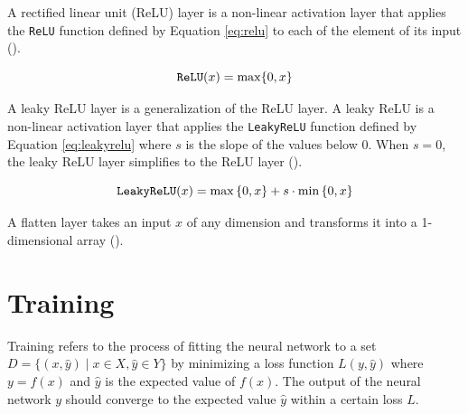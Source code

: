 A rectified linear unit (ReLU) layer is a non-linear activation layer that applies the \verb|ReLU| function defined by Equation \ref{eq:relu} to each of the element of its input (\cite{activation}). 

\begin{equation}
    \verb|ReLU|(x) =  \max\{0, x\}
    \label{eq:relu}
\end{equation}

A leaky ReLU layer is a generalization of the ReLU layer. A leaky ReLU is a non-linear activation layer that applies the \verb|LeakyReLU| function defined by Equation \ref{eq:leakyrelu} where $s$ is the slope of the values below $0$. When $s=0$, the leaky ReLU layer simplifies to the ReLU layer (\cite{activation}).

\begin{equation}
    \verb|LeakyReLU|(x) = \max{\{0, x\}} + s \cdot \min{\{0, x\}}
    \label{eq:leakyrelu}
\end{equation}

A flatten layer takes an input $x$ of any dimension and transforms it into a 1-dimensional array (\cite{chollet2015keras}).




\section{Training}

Training refers to the process of fitting the neural network to a set $D = \{ (x,\hat{y}) \mid x \in X, \hat{y} \in Y\}$ by minimizing a loss function $L(y, \hat{y})$ where $y = f(x)$ and $\hat{y}$ is the expected value of $f(x)$. The output of the neural network $y$ should converge to the expected value $\hat{y}$ within a certain loss $L$. 

